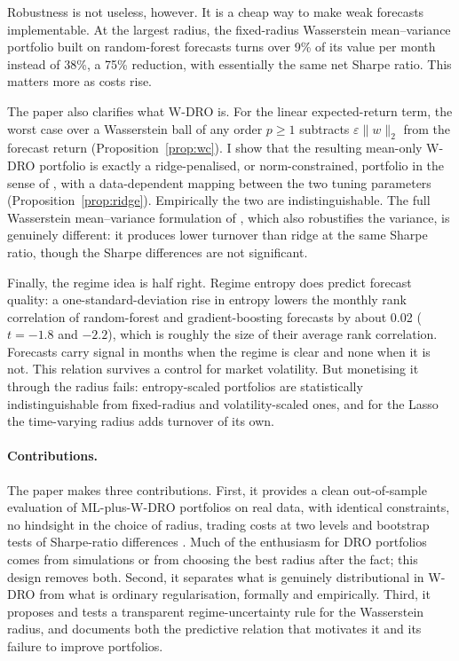 \documentclass[11pt]{article}
\begin{document}
Robustness is not useless, however. It is a cheap way to make weak forecasts implementable. At the largest radius, the fixed-radius Wasserstein mean--variance portfolio built on random-forest forecasts turns over 9\% of its value per month instead of 38\%, a 75\% reduction, with essentially the same net Sharpe ratio. This matters more as costs rise.

The paper also clarifies what W-DRO is. For the linear expected-return term, the worst case over a Wasserstein ball of any order $p \ge 1$ subtracts $\varepsilon\lVert w\rVert_2$ from the forecast return (Proposition~\ref{prop:wc}). I show that the resulting mean-only W-DRO portfolio is exactly a ridge-penalised, or norm-constrained, portfolio in the sense of \citet{demiguel2009ms}, with a data-dependent mapping between the two tuning parameters (Proposition~\ref{prop:ridge}). Empirically the two are indistinguishable. The full Wasserstein mean--variance formulation of \citet{blanchet2022}, which also robustifies the variance, is genuinely different: it produces lower turnover than ridge at the same Sharpe ratio, though the Sharpe differences are not significant.

Finally, the regime idea is half right. Regime entropy does predict forecast quality: a one-standard-deviation rise in entropy lowers the monthly rank correlation of random-forest and gradient-boosting forecasts by about 0.02 ($t=-1.8$ and $-2.2$), which is roughly the size of their average rank correlation. Forecasts carry signal in months when the regime is clear and none when it is not. This relation survives a control for market volatility. But monetising it through the radius fails: entropy-scaled portfolios are statistically indistinguishable from fixed-radius and volatility-scaled ones, and for the Lasso the time-varying radius adds turnover of its own.

\paragraph{Contributions.} The paper makes three contributions. First, it provides a clean out-of-sample evaluation of ML-plus-W-DRO portfolios on real data, with identical constraints, no hindsight in the choice of radius, trading costs at two levels and bootstrap tests of Sharpe-ratio differences \citep{ledoit2008}. Much of the enthusiasm for DRO portfolios comes from simulations or from choosing the best radius after the fact; this design removes both. Second, it separates what is genuinely distributional in W-DRO from what is ordinary regularisation, formally and empirically. Third, it proposes and tests a transparent regime-uncertainty rule for the Wasserstein radius, and documents both the predictive relation that motivates it and its failure to improve portfolios.
\end{document}
